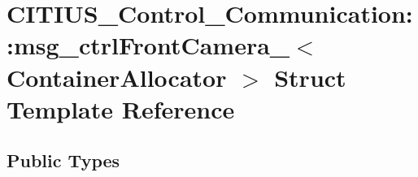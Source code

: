 \hypertarget{struct_c_i_t_i_u_s___control___communication_1_1msg__ctrl_front_camera__}{\section{\-C\-I\-T\-I\-U\-S\-\_\-\-Control\-\_\-\-Communication\-:\-:msg\-\_\-ctrl\-Front\-Camera\-\_\-$<$ \-Container\-Allocator $>$ \-Struct \-Template \-Reference}
\label{struct_c_i_t_i_u_s___control___communication_1_1msg__ctrl_front_camera__}
}
\subsection*{\-Public \-Types}

